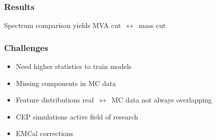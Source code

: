 \documentclass{beamer}
\begin{document}
\begin{frame}
    \frametitle{Results}
    Spectrum comparison yields MVA cut~$\leftrightarrow$~mass cut\\
    \vspace*{5mm}
    \centering{}
\end{frame}


\begin{frame}
    \frametitle{Challenges}
    \begin{itemize}
        \item Need higher statistics to train models
        \item Missing components in MC data 
        \item Feature distributions real~$\leftrightarrow$~MC data not always overlapping
        \item CEP simulations active field of research
        \item EMCal corrections
    \end{itemize}
\end{frame}
\end{document}
